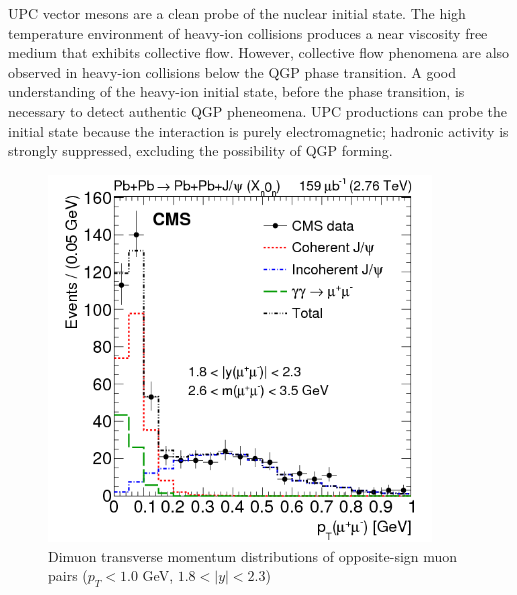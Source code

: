 UPC vector mesons are a clean probe of the nuclear initial state. The high temperature environment of heavy-ion collisions produces a near viscosity free medium that exhibits collective flow. However, collective flow phenomena are also observed in heavy-ion collisions below the QGP phase transition. A good understanding of the heavy-ion initial state, before the phase transition, is necessary to detect authentic QGP pheneomena. UPC productions can probe the initial state because the interaction is purely electromagnetic; hadronic activity is strongly suppressed, excluding the possibility of QGP forming. 
\begin{figure}[h!]
\begin{centering}
\includegraphics[width=4in]{Chapter2/importfigs/patkenny_Figure_001-b.png}
\par\end{centering}
\caption{Dimuon transverse momentum distributions of opposite-sign muon pairs ($p_T<1.0$ GeV, $1.8<|y|<2.3$) \cite{Khachatryan:2016qhq} \label{fig:pk2}}
\end{figure}

